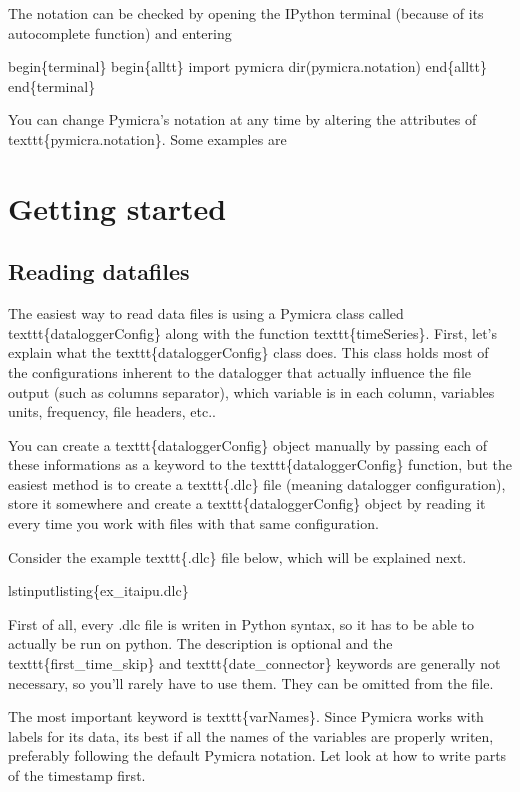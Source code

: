 \documentclass[a4paper,10pt,english]{sphinxmanual}
\begin{document}
The notation can be checked by opening the IPython terminal (because of its
autocomplete function) and entering

begin\{terminal\}
begin\{alltt\}
import pymicra
dir(pymicra.notation)
end\{alltt\}
end\{terminal\}

You can change Pymicra's notation at any time by altering the attributes of
texttt\{pymicra.notation\}. Some examples are


\section{Getting started}
\label{tutorial:getting-started}\label{tutorial::doc}

\subsection{Reading datafiles}
\label{tutorial:reading-datafiles}
The easiest way to read data files is using a Pymicra class called
texttt\{dataloggerConfig\} along with the function texttt\{timeSeries\}. First,
let's explain what the texttt\{dataloggerConfig\} class does. This class holds
most of the configurations inherent to the datalogger that actually influence
the file output (such as columns separator), which variable is in each column,
variables units, frequency, file headers, etc..

You can create a texttt\{dataloggerConfig\} object manually by passing each of
these informations as a keyword to the texttt\{dataloggerConfig\} function, but
the easiest method is to create a texttt\{.dlc\} file (meaning datalogger
configuration), store it somewhere and create a texttt\{dataloggerConfig\} object
by reading it every time you work with files with that same configuration.

Consider the example texttt\{.dlc\} file below, which will be explained next.

lstinputlisting\{ex\_itaipu.dlc\}

First of all, every .dlc file is writen in Python syntax, so it has to be able
to actually be run on python. The description is optional and the
texttt\{first\_time\_skip\} and texttt\{date\_connector\} keywords are generally
not necessary, so you'll rarely have to use them. They can be omitted from the
file.

The most important keyword is texttt\{varNames\}. Since Pymicra works with labels for its
data, its best if all the names of the variables are properly writen, preferably
following the default Pymicra notation. Let look at how to write parts of the
timestamp first.
\end{document}
